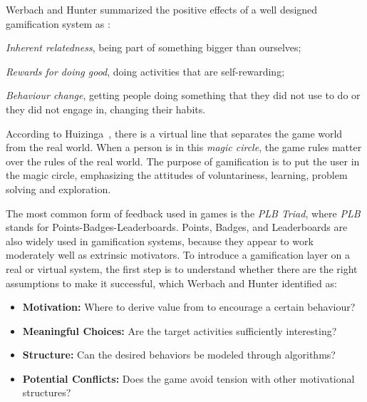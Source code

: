 Werbach and Hunter summarized the positive effects of a well designed gamification system as \cite{Werb2012a}:
\begin{inparaenum}[i)]
  \item \emph{Inherent relatedness}, \ie being part of something bigger than ourselves;
  \item \emph{Rewards for doing good}, \ie doing activities that are self-rewarding;
  \item \emph{Behaviour change}, \ie getting people doing something that they did not use to do or they did not engage in, changing their habits.
\end{inparaenum}

According to Huizinga~\cite{Huizinga2006}, there is a virtual line that separates the game world from the real world. When a person is in this \emph{magic circle}, the game rules matter over the rules of the real world. The purpose of gamification is to put the user in the magic circle, emphasizing the attitudes of voluntariness, learning, problem solving and exploration.

The most common form of feedback used in games is the \emph{PLB Triad}, where \emph{PLB} stands for Points-Badges-Leaderboards. Points, Badges, and Leaderboards are also widely used in gamification systems, because they appear to work moderately well as extrinsic motivators. To introduce a gamification layer on a real or virtual system, the first step is to understand whether there are the right assumptions to make it successful, which Werbach and Hunter \cite{Werb2012a} identified as:

\begin{itemize}
  \item \textbf{Motivation:} Where to derive value from to encourage a certain behaviour?
  \item \textbf{Meaningful Choices:} Are the target activities sufficiently interesting?
  \item \textbf{Structure:} Can the desired behaviors be modeled through algorithms?
  \item \textbf{Potential Conflicts:} Does the game avoid tension with other motivational structures?
\end{itemize}

